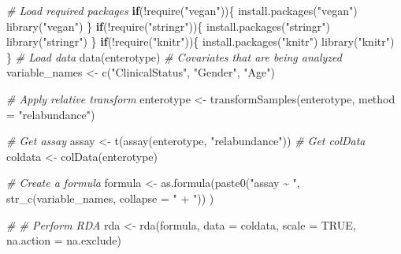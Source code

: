 \documentclass[
]{book}
\newenvironment{Shaded}{\begin{snugshade}}{\end{snugshade}}
\newcommand{\AttributeTok}[1]{\textcolor[rgb]{0.77,0.63,0.00}{#1}}
\newcommand{\CommentTok}[1]{\textcolor[rgb]{0.56,0.35,0.01}{\textit{#1}}}
\newcommand{\ConstantTok}[1]{\textcolor[rgb]{0.00,0.00,0.00}{#1}}
\newcommand{\ControlFlowTok}[1]{\textcolor[rgb]{0.13,0.29,0.53}{\textbf{#1}}}
\newcommand{\FunctionTok}[1]{\textcolor[rgb]{0.00,0.00,0.00}{#1}}
\newcommand{\NormalTok}[1]{#1}
\newcommand{\OtherTok}[1]{\textcolor[rgb]{0.56,0.35,0.01}{#1}}
\newcommand{\SpecialCharTok}[1]{\textcolor[rgb]{0.00,0.00,0.00}{#1}}
\newcommand{\StringTok}[1]{\textcolor[rgb]{0.31,0.60,0.02}{#1}}
\begin{document}
\begin{Shaded}
\begin{Highlighting}[]
\CommentTok{\# Load required packages}
\ControlFlowTok{if}\NormalTok{(}\SpecialCharTok{!}\FunctionTok{require}\NormalTok{(}\StringTok{"vegan"}\NormalTok{))\{}
    \FunctionTok{install.packages}\NormalTok{(}\StringTok{"vegan"}\NormalTok{)}
    \FunctionTok{library}\NormalTok{(}\StringTok{"vegan"}\NormalTok{)}
\NormalTok{\}}
\ControlFlowTok{if}\NormalTok{(}\SpecialCharTok{!}\FunctionTok{require}\NormalTok{(}\StringTok{"stringr"}\NormalTok{))\{}
    \FunctionTok{install.packages}\NormalTok{(}\StringTok{"stringr"}\NormalTok{)}
    \FunctionTok{library}\NormalTok{(}\StringTok{"stringr"}\NormalTok{)}
\NormalTok{\}}
\ControlFlowTok{if}\NormalTok{(}\SpecialCharTok{!}\FunctionTok{require}\NormalTok{(}\StringTok{"knitr"}\NormalTok{))\{}
    \FunctionTok{install.packages}\NormalTok{(}\StringTok{"knitr"}\NormalTok{)}
    \FunctionTok{library}\NormalTok{(}\StringTok{"knitr"}\NormalTok{)}
\NormalTok{\}}
\CommentTok{\# Load data}
\FunctionTok{data}\NormalTok{(enterotype)}
\CommentTok{\# Covariates that are being analyzed}
\NormalTok{variable\_names }\OtherTok{\textless{}{-}} \FunctionTok{c}\NormalTok{(}\StringTok{"ClinicalStatus"}\NormalTok{, }\StringTok{"Gender"}\NormalTok{, }\StringTok{"Age"}\NormalTok{)}

\CommentTok{\# Apply relative transform}
\NormalTok{enterotype }\OtherTok{\textless{}{-}} \FunctionTok{transformSamples}\NormalTok{(enterotype, }\AttributeTok{method =} \StringTok{"relabundance"}\NormalTok{)}

\CommentTok{\# Get assay}
\NormalTok{assay }\OtherTok{\textless{}{-}} \FunctionTok{t}\NormalTok{(}\FunctionTok{assay}\NormalTok{(enterotype, }\StringTok{"relabundance"}\NormalTok{))}
\CommentTok{\# Get colData}
\NormalTok{coldata }\OtherTok{\textless{}{-}} \FunctionTok{colData}\NormalTok{(enterotype)}

\CommentTok{\# Create a formula}
\NormalTok{formula }\OtherTok{\textless{}{-}} \FunctionTok{as.formula}\NormalTok{(}\FunctionTok{paste0}\NormalTok{(}\StringTok{"assay \textasciitilde{} "}\NormalTok{, }\FunctionTok{str\_c}\NormalTok{(variable\_names, }\AttributeTok{collapse =} \StringTok{" + "}\NormalTok{)) )}

\CommentTok{\# \# Perform RDA}
\NormalTok{rda }\OtherTok{\textless{}{-}} \FunctionTok{rda}\NormalTok{(formula, }\AttributeTok{data =}\NormalTok{ coldata, }\AttributeTok{scale =} \ConstantTok{TRUE}\NormalTok{, }\AttributeTok{na.action =}\NormalTok{ na.exclude)}


\end{Highlighting}
\end{Shaded}
\end{document}
